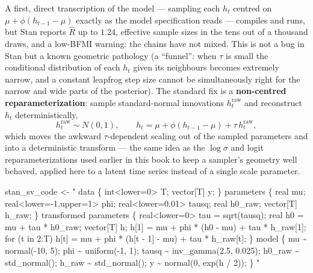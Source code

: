 \documentclass[
  letterpaper,
  DIV=11,
  numbers=noendperiod]{scrreprt}
\newenvironment{Shaded}{\begin{snugshade}}{\end{snugshade}}
\newcommand{\NormalTok}[1]{\textcolor[rgb]{0.00,0.23,0.31}{#1}}
\newcommand{\OtherTok}[1]{\textcolor[rgb]{0.00,0.23,0.31}{#1}}
\newcommand{\StringTok}[1]{\textcolor[rgb]{0.13,0.47,0.30}{#1}}
\begin{document}
A first, direct transcription of the model --- sampling each \(h_t\)
centred on \(\mu + \phi(h_{t-1}-\mu)\) exactly as the model
specification reads --- compiles and runs, but Stan reports \(\hat R\)
up to \(1.24\), effective sample sizes in the tens out of a thousand
draws, and a low-BFMI warning: the chains have not mixed. This is not a
bug in Stan but a known geometric pathology (a ``funnel'': when \(\tau\)
is small the conditional distribution of each \(h_t\) given its
neighbours becomes extremely narrow, and a constant leapfrog step size
cannot be simultaneously right for the narrow and wide parts of the
posterior). The standard fix is a \textbf{non-centred
reparameterization}: sample standard-normal innovations
\(h_t^{\text{raw}}\) and reconstruct \(h_t\) deterministically, \[
h_t^{\text{raw}} \sim N(0,1), \qquad h_t = \mu + \phi(h_{t-1}-\mu) + \tau\, h_t^{\text{raw}},
\] which moves the awkward \(\tau\)-dependent scaling out of the sampled
parameters and into a deterministic transform --- the same idea as the
\(\log\sigma\) and logit reparameterizations used earlier in this book
to keep a sampler's geometry well behaved, applied here to a latent time
series instead of a single scale parameter.

\begin{Shaded}
\begin{Highlighting}[]
\NormalTok{stan\_sv\_code }\OtherTok{\textless{}{-}} \StringTok{"}
\StringTok{data \{}
\StringTok{  int\textless{}lower=0\textgreater{} T;}
\StringTok{  vector[T] y;}
\StringTok{\}}
\StringTok{parameters \{}
\StringTok{  real mu;}
\StringTok{  real\textless{}lower={-}1,upper=1\textgreater{} phi;}
\StringTok{  real\textless{}lower=0.01\textgreater{} tausq;}
\StringTok{  real h0\_raw;}
\StringTok{  vector[T] h\_raw;}
\StringTok{\}}
\StringTok{transformed parameters \{}
\StringTok{  real\textless{}lower=0\textgreater{} tau = sqrt(tausq);}
\StringTok{  real h0 = mu + tau * h0\_raw;}
\StringTok{  vector[T] h;}
\StringTok{  h[1] = mu + phi * (h0 {-} mu) + tau * h\_raw[1];}
\StringTok{  for (t in 2:T)}
\StringTok{    h[t] = mu + phi * (h[t {-} 1] {-} mu) + tau * h\_raw[t];}
\StringTok{\}}
\StringTok{model \{}
\StringTok{  mu \textasciitilde{} normal({-}10, 5);}
\StringTok{  phi \textasciitilde{} uniform({-}1, 1);}
\StringTok{  tausq \textasciitilde{} inv\_gamma(2.5, 0.025);}
\StringTok{  h0\_raw \textasciitilde{} std\_normal();}
\StringTok{  h\_raw \textasciitilde{} std\_normal();}
\StringTok{  y \textasciitilde{} normal(0, exp(h / 2));}
\StringTok{\}}
\StringTok{"}
\end{Highlighting}
\end{Shaded}
\end{document}
